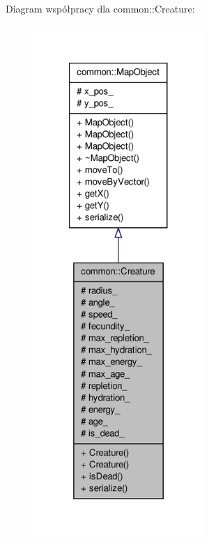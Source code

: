 Diagram współpracy dla common\-:\-:Creature\-:
\nopagebreak
\begin{figure}[H]
\begin{center}
\leavevmode
\includegraphics[height=550pt]{classcommon_1_1Creature__coll__graph}
\end{center}
\end{figure}

